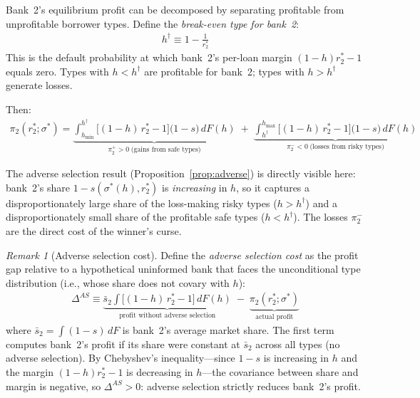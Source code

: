 \documentclass[12pt]{article}
\theoremstyle{plain}
\theoremstyle{plain}
\theoremstyle{definition}  %
\theoremstyle{remark}  %
\newtheorem{remark}[thm]{Remark}  %
\begin{document}
Bank~2's equilibrium profit can be decomposed by separating profitable from unprofitable borrower types. Define the \emph{break-even type for bank~2}:
\begin{align}\label{eq:hdagger}
    h^\dagger \equiv 1 - \frac{1}{r_2^*}
\end{align}
This is the default probability at which bank~2's per-loan margin $(1-h)r_2^* - 1$ equals zero. Types with $h < h^\dagger$ are profitable for bank~2; types with $h > h^\dagger$ generate losses.

\medskip\noindent
Then:
\begin{align}\label{eq:pi2_decomp}
    \pi_2(r_2^*; \sigma^*) = \underbrace{\int_{h_{\min}}^{h^\dagger} \big[(1-h)\,r_2^* - 1\big]\big(1-s\big)\, dF(h)}_{\displaystyle\pi_2^+ > 0 \;\text{(gains from safe types)}} \;+\; \underbrace{\int_{h^\dagger}^{h_{\max}} \big[(1-h)\,r_2^* - 1\big]\big(1-s\big)\, dF(h)}_{\displaystyle\pi_2^- < 0 \;\text{(losses from risky types)}}
\end{align}

The adverse selection result (Proposition~\ref{prop:adverse}) is directly visible here: bank~2's share $1-s(\sigma^*(h), r_2^*)$ is \emph{increasing} in $h$, so it captures a disproportionately large share of the loss-making risky types ($h > h^\dagger$) and a disproportionately small share of the profitable safe types ($h < h^\dagger$). The losses $\pi_2^-$ are the direct cost of the winner's curse.

\begin{remark}[Adverse selection cost]\label{rem:as_cost}
Define the \emph{adverse selection cost} as the profit gap relative to a hypothetical uninformed bank that faces the unconditional type distribution (i.e., whose share does not covary with $h$):
\begin{align}\label{eq:AS_cost}
    \Delta^{AS} \equiv \underbrace{\bar{s}_2 \int \big[(1-h)\,r_2^* - 1\big]\, dF(h)}_{\text{profit without adverse selection}} \;-\; \underbrace{\pi_2(r_2^*;\sigma^*)}_{\text{actual profit}}
\end{align}
where $\bar{s}_2 = \int (1-s)\, dF$ is bank~2's average market share. The first term computes bank~2's profit if its share were constant at $\bar{s}_2$ across all types (no adverse selection). By Chebyshev's inequality---since $1-s$ is increasing in $h$ and the margin $(1-h)r_2^* - 1$ is decreasing in $h$---the covariance between share and margin is negative, so $\Delta^{AS} > 0$: adverse selection strictly reduces bank~2's profit.
\end{remark}
\end{document}
